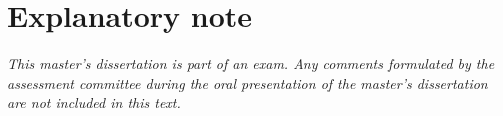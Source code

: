 
\titleformat{\chapter}{}{}{0em}{\bf\Huge}
\chapter*{Explanatory note}

\vspace{6cm}


\textit{This master's dissertation is part of an exam. Any comments formulated by the
assessment committee during the oral presentation of the master's dissertation are
not included in this text.}